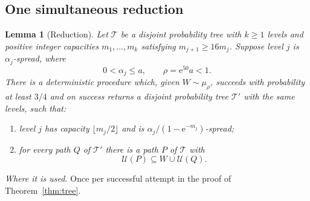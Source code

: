 \documentclass[11pt]{article}
\newtheorem{lemma}[theorem]{Lemma}
\numberwithin{equation}{section}
\theoremstyle{remark}
\newcommand{\TT}{\mathcal T}
\newcommand{\UU}{\mathcal U}
\newcommand{\ee}{\mathrm e}
\begin{document}
\subsection{One simultaneous reduction}

\begin{lemma}[Reduction]\label{lem:reduction}
Let $\TT$ be a disjoint probability tree with $k\ge1$ levels and
positive integer capacities $m_1,\ldots,m_k$ satisfying
$m_{j+1}\ge16m_j$. Suppose level $j$ is $\alpha_j$-spread, where
\[
 0<\alpha_j\le a,\qquad \rho=\ee^{50}a<1.
\]
There is a deterministic procedure which, given $W\sim\mu_\rho$,
succeeds with probability at least $3/4$ and on success returns a
disjoint probability tree $\TT'$ with the same levels, such that:
\begin{enumerate}[label=(\roman*),leftmargin=2.2em,itemsep=3pt]
 \item level $j$ has capacity $\lfloor m_j/2\rfloor$ and is
 $\alpha_j/(1-\ee^{-m_j})$-spread;
 \item for every path $Q$ of $\TT'$ there is a path $P$ of $\TT$ with
 \begin{equation}\label{eq:recovery}
   \UU(P)\subseteq W\cup\UU(Q).
 \end{equation}
\end{enumerate}
\end{lemma}

\emph{Where it is used.} Once per successful attempt in the proof of
Theorem~\ref{thm:tree}.
\end{document}
